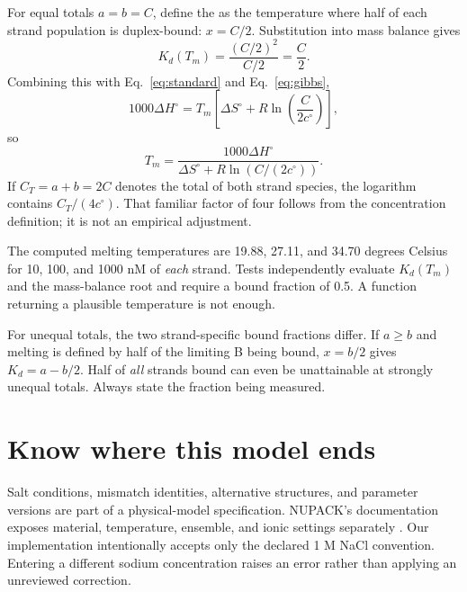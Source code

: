 For equal totals $a=b=C$, define the  as the
temperature where half of each strand population is duplex-bound:
$x=C/2$. Substitution into mass balance gives
\begin{equation}
K_d(T_m)=\frac{(C/2)^2}{C/2}=\frac C2.
\end{equation}
Combining this with Eq.~\ref{eq:standard} and Eq.~\ref{eq:gibbs},
\begin{equation}
1000\Delta H^\circ
=T_m\left[\Delta S^\circ+R\ln\left(\frac{C}{2c^\circ}\right)\right],
\end{equation}
so
\begin{equation}
T_m=
\frac{1000\Delta H^\circ}
{\Delta S^\circ+R\ln(C/(2c^\circ))}.
\label{eq:tm}
\end{equation}
If $C_T=a+b=2C$ denotes the total of both strand species, the logarithm
contains $C_T/(4c^\circ)$. That familiar factor of four follows from the
concentration definition; it is not an empirical adjustment.



The computed melting temperatures are 19.88, 27.11, and 34.70 degrees Celsius
for 10, 100, and 1000 nM of \emph{each} strand. Tests independently evaluate
$K_d(T_m)$ and the mass-balance root and require a bound fraction of 0.5.
A function returning a plausible temperature is not enough.

For unequal totals, the two strand-specific bound fractions differ.
If $a\geq b$ and melting is defined by half of the limiting B being bound,
$x=b/2$ gives $K_d=a-b/2$. Half of \emph{all} strands bound can even be
unattainable at strongly unequal totals. Always state the fraction being measured.

\section{Know where this model ends}

Salt conditions, mismatch identities, alternative structures, and parameter
versions are part of a physical-model specification. NUPACK's documentation
exposes material, temperature, ensemble, and ionic settings separately
\cite{NUPACKmodel}. Our implementation intentionally accepts only the declared
1 M NaCl convention. Entering a different sodium concentration raises an
error rather than applying an unreviewed correction.

